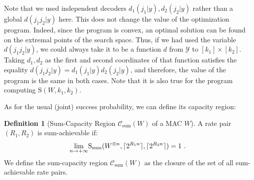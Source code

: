 \documentclass[11pt]{article}
\theoremstyle{definition}
\newtheorem{defi}[theo]{Definition}
\theoremstyle{remark}
\DeclarePairedDelimiter\ceil{\lceil}{\rceil}
\begin{document}
Note that we used independent decoders $d_1(j_1|y),d_2(j_2|y)$ rather than a global $d(j_1j_2|y)$ here. This does not change the value of the optimization program. Indeed, since the program is convex, an optimal solution can be found on the extremal points of the search space. Thus, if we had used the variable $d(j_1j_2|y)$, we could always take it to be a function $d$ from $\mathcal{Y}$ to $[k_1]\times[k_2]$. Taking $d_1,d_2$ as the first and second coordinates of that function satisfies the equality $d(j_1j_2|y) = d_1(j_1|y)d_2(j_2|y)$, and therefore, the value of the program is the same in both cases. Note that it is also true for the program computing $\mathrm{S}(W,k_1,k_2)$.

As for the usual (joint) success probability, we can define its capacity region:

\begin{defi}[Sum-Capacity Region $\mathcal{C}_{\text{sum}}(W)$ of a MAC $W$]
  A rate pair $(R_1,R_2)$ is sum-achievable if:
  \[ \underset{n \rightarrow +\infty}{\lim} \mathrm{S}_{\text{sum}}(W^{\otimes n},\ceil{2^{R_1n}},\ceil{2^{R_2n}}) = 1 \ . \]
  We define the sum-capacity region $\mathcal{C}_{\text{sum}}(W)$ as the closure of the set of all sum-achievable rate pairs.
\end{defi}
\end{document}
